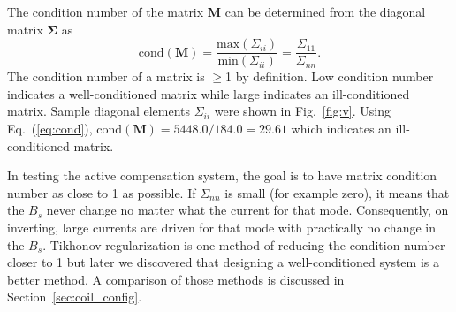 The condition number of the matrix $\bm{M}$ can be determined from the diagonal matrix $\bm{\Sigma}$ as 
 \begin{equation}\label{eq:cond}
     \mathrm{cond}(\bm{M})=\frac{\mathrm{max}(\Sigma_{ii})}{\mathrm{min}(\Sigma_{ii})}=\frac{\Sigma_{11}}{\Sigma_{nn}}\text{.}
 \end{equation}
The condition number of a matrix is $\geq$1 by definition. Low condition number indicates a well-conditioned matrix while large indicates an ill-conditioned matrix. Sample diagonal elements $\Sigma_{ii}$ were shown in Fig.~\ref{fig:v}. Using Eq.~(\ref{eq:cond}),  $\mathrm{cond}(\bm{M})=5448.0/184.0=29.61$ which indicates an ill-conditioned matrix. 


In testing the active compensation system, the goal is to have matrix condition number as close to 1 as possible. If $\Sigma_{nn}$ is small (for example zero), it means that the $B_s$ never change no matter what the current for that mode. Consequently, on inverting, large currents are driven for that mode with practically no change in the $B_s$. Tikhonov regularization is one method of reducing the condition number closer to 1 but later we discovered that designing a well-conditioned system is a better method. A comparison of those methods is discussed in Section~\ref{sec:coil_config}.


